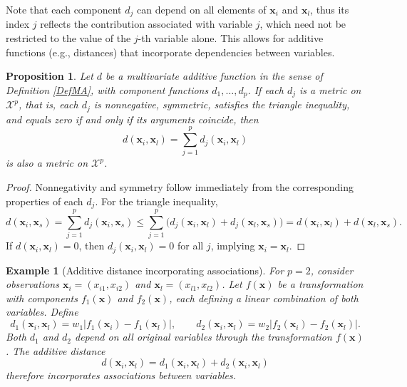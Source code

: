 \documentclass[12pt]{article}
\newtheorem{example}{Example}
\newtheorem{proposition}{Proposition}
\begin{document}
Note that each component $d_j$ can depend on all elements of $\mathbf{x}_i$ and $\mathbf{x}_l$, thus its index $j$ reflects the contribution associated with variable $j$, which need not be restricted to the value of the $j$-th variable alone. This allows for additive functions (e.g., distances) that incorporate dependencies between variables.

\begin{proposition}\label{prop:sum_metric}
Let $d$ be a multivariate additive function in the sense of Definition \ref{DefMA}, with component functions $d_1,\dots,d_p$. If each $d_j$ is a metric on $\mathcal{X}^p$, that is, each $d_j$ is nonnegative, symmetric, satisfies the triangle inequality, and equals zero if and only if its arguments coincide, then
\begin{equation*}
d(\mathbf{x}_i,\mathbf{x}_l)=\sum_{j=1}^p d_j(\mathbf{x}_i,\mathbf{x}_l)
\end{equation*}
is also a metric on $\mathcal{X}^p$.
\end{proposition}

\begin{proof}
Nonnegativity and symmetry follow immediately from the corresponding properties of each $d_j$. For the triangle inequality,
\begin{equation*}
d(\mathbf{x}_i,\mathbf{x}_s)
= \sum_{j=1}^p d_j(\mathbf{x}_i,\mathbf{x}_s)
\le \sum_{j=1}^p \bigl(d_j(\mathbf{x}_i,\mathbf{x}_l)+d_j(\mathbf{x}_l,\mathbf{x}_s)\bigr)
= d(\mathbf{x}_i,\mathbf{x}_l)+d(\mathbf{x}_l,\mathbf{x}_s).
\end{equation*}
If $d(\mathbf{x}_i,\mathbf{x}_l)=0$, then $d_j(\mathbf{x}_i,\mathbf{x}_l)=0$ for all $j$, implying $\mathbf{x}_i=\mathbf{x}_l$.
\end{proof}

\begin{example}[Additive distance incorporating associations] For $p=2$, consider observations $\mathbf{x}_i=(x_{i1},x_{i2})$ and $\mathbf{x}_l=(x_{l1},x_{l2})$.
Let $f(\mathbf{x})$ be a transformation with components $f_1(\mathbf{x})$ and $f_2(\mathbf{x})$, each defining a linear combination of both variables.
Define
\begin{equation*}
d_1(\mathbf{x}_i,\mathbf{x}_l)=w_1|f_1(\mathbf{x}_i)-f_1(\mathbf{x}_l)|,\qquad
d_2(\mathbf{x}_i,\mathbf{x}_l)=w_2|f_2(\mathbf{x}_i)-f_2(\mathbf{x}_l)|.
\end{equation*}
Both $d_1$ and $d_2$ depend on all original variables through the transformation $f(\mathbf{x})$.
The additive distance
\begin{equation*}
d(\mathbf{x}_i,\mathbf{x}_l)=d_1(\mathbf{x}_i,\mathbf{x}_l)+d_2(\mathbf{x}_i,\mathbf{x}_l)
\end{equation*}
therefore incorporates associations between variables.
\end{example}
\end{document}
